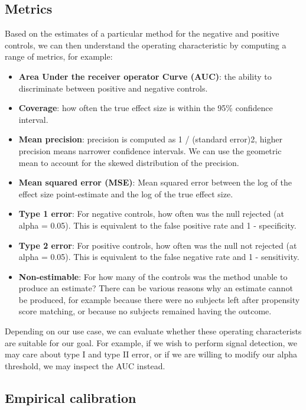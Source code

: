 \documentclass[]{book}
\providecommand{\tightlist}{%
  \setlength{\itemsep}{0pt}\setlength{\parskip}{0pt}}
\begin{document}
\subsection{Metrics}\label{metrics}

Based on the estimates of a particular method for the negative and
positive controls, we can then understand the operating characteristic
by computing a range of metrics, for example:

\begin{itemize}
\tightlist
\item
  \textbf{Area Under the receiver operator Curve (AUC)}: the ability to
  discriminate between positive and negative controls.
\item
  \textbf{Coverage}: how often the true effect size is within the 95\%
  confidence interval.
\item
  \textbf{Mean precision}: precision is computed as 1 / (standard
  error)2, higher precision means narrower confidence intervals. We can
  use the geometric mean to account for the skewed distribution of the
  precision.
\item
  \textbf{Mean squared error (MSE)}: Mean squared error between the log
  of the effect size point-estimate and the log of the true effect size.
\item
  \textbf{Type 1 error}: For negative controls, how often was the null
  rejected (at alpha = 0.05). This is equivalent to the false positive
  rate and 1 - specificity.
\item
  \textbf{Type 2 error}: For positive controls, how often was the null
  not rejected (at alpha = 0.05). This is equivalent to the false
  negative rate and 1 - sensitivity.
\item
  \textbf{Non-estimable}: For how many of the controls was the method
  unable to produce an estimate? There can be various reasons why an
  estimate cannot be produced, for example because there were no
  subjects left after propensity score matching, or because no subjects
  remained having the outcome.
\end{itemize}

Depending on our use case, we can evaluate whether these operating
characterists are suitable for our goal. For example, if we wish to
perform signal detection, we may care about type I and type II error, or
if we are willing to modify our alpha threshold, we may inspect the AUC
instead.

\subsection{Empirical calibration}\label{empirical-calibration}
\end{document}
